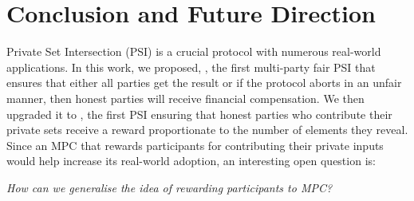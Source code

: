 

\section{Conclusion and Future Direction}\label{sec::concl}


Private Set Intersection (PSI) is a crucial protocol with numerous real-world applications. In this work, we proposed, \withFai, the first multi-party fair PSI that ensures that either all parties get the result or if the protocol aborts in an unfair manner, then honest parties will receive financial compensation. We then upgraded it to \withRew, the first PSI ensuring that honest parties who contribute their private sets receive a reward proportionate to the number of elements they reveal. Since an MPC that rewards participants for contributing their private inputs would help increase its real-world adoption, an interesting open question is:
%
\begin{center}
%
 \emph{How can we generalise the idea of rewarding participants to MPC?}
 \end{center}